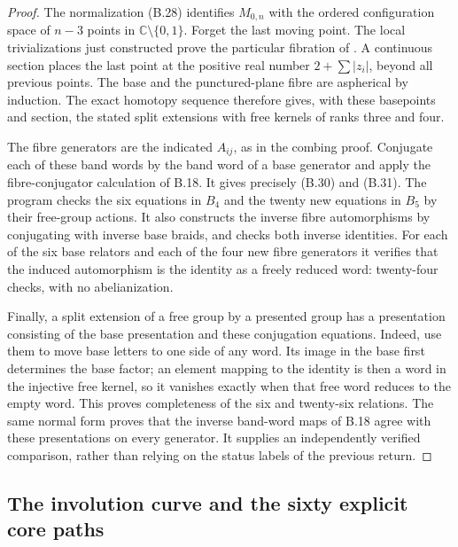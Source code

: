 \begin{proof}
The normalization (B.28) identifies $M_{0,n}$ with the ordered
configuration space of $n-3$ points in
$\mathbb C\setminus\{0,1\}$.  Forget the last moving point.
The local trivializations just constructed prove the particular
fibration of \citet[Theorem 1]{B_FadellNeuwirth}.  A continuous
section places the last point at the positive real number
$2+\sum |z_i|$, beyond all previous points.  The base and the
punctured-plane fibre are aspherical by induction.  The exact
homotopy sequence therefore gives, with these basepoints and
section, the stated split extensions with free kernels of
ranks three and four.

The fibre generators are the indicated $A_{ij}$, as in the
combing proof.  Conjugate each of these band words by the band
word of a base generator and apply the fibre-conjugator
calculation of B.18.  It gives precisely (B.30) and (B.31).
The program checks the six equations in $B_4$ and the twenty new
equations in $B_5$ by their free-group actions.  It also constructs
the inverse fibre automorphisms by conjugating with inverse base
braids, and checks both inverse identities.  For each of the six
base relators and each of the four new fibre generators it
verifies that the induced automorphism is the identity as a
freely reduced word: twenty-four checks, with no abelianization.

Finally, a split extension of a free group by a presented group
has a presentation consisting of the base presentation and these
conjugation equations.  Indeed, use them to move base letters to
one side of any word.  Its image in the base first determines the
base factor; an element mapping to the identity is then a word
in the injective free kernel, so it vanishes exactly when that
free word reduces to the empty word.  This proves completeness
of the six and twenty-six relations.  The same normal form proves
that the inverse band-word maps of B.18 agree with these
presentations on every generator.  It supplies an independently
verified comparison, rather than relying on the status labels of
the previous return.
\end{proof}

\subsection{The involution curve and the sixty explicit core paths}

